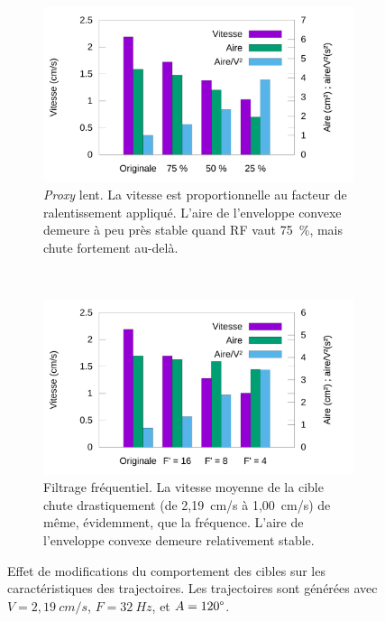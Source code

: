 	\begin{figure}[!htb]
		\begin{subfigure}[t]{0.49\textwidth}
			\centering
			\includegraphics[width=\textwidth]{figures/ch5/filteringBySpeedRedHistograms}
			\caption{\emph{Proxy} lent. La vitesse est proportionnelle au facteur de ralentissement appliqué. L'aire de l'enveloppe convexe demeure à peu près stable quand RF vaut 75~\%{}, mais chute fortement au-delà.}
			\label{fig:filteringBySpeedRed}
		\end{subfigure}
		~
		\begin{subfigure}[t]{0.49\textwidth}
			\centering
			\includegraphics[width=\textwidth]{figures/ch5/filteringByFHistograms}
			\caption{Filtrage fréquentiel. La vitesse moyenne de la cible chute drastiquement (de 2,19~cm/s à 1,00~cm/s) de même, évidemment, que la fréquence. L'aire de l'enveloppe convexe demeure relativement stable.}
			\label{fig:filteringByFHistograms}
		\end{subfigure}
		\caption[Effet de modifications du comportement des cibles]{Effet de modifications du comportement des cibles sur les caractéristiques des trajectoires. Les trajectoires sont générées avec $V=2,19~cm/s$, $F=32~Hz$, et $A=120\degree{}$.}
		\label{fig:speedRedAndFilteringbyFhistograms}
	\end{figure}
	
